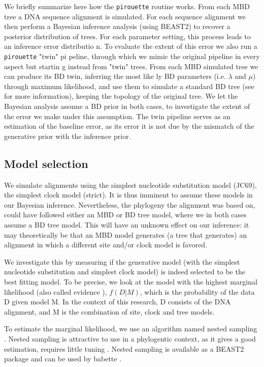 We briefly summarize here how the \verb;pirouette; routine works.
From each MBD tree a DNA sequence alignment is simulated. 
For each sequence alignment we then perform a Bayesian inference analysis (using
 BEAST2) to recover a posterior distribution of trees. 
For each parameter setting, this process leads to an inference error distributio
n. To evaluate the extent of this error we also run a \verb;pirouette; "twin" pi
peline, through which we mimic the original pipeline in every aspect but startin
g instead from "twin" trees.
From each MBD simulated tree we can produce its BD twin, inferring the most like
ly BD parameters (i.e. $\lambda$ and $\mu$) through maximum likelihood, and use 
them to simulate a standard BD tree (see \cite{pirouette} for more information),
 keeping the topology of the original tree.
We let the Bayesian analysis assume a BD prior in both cases, to investigate the
 extent of the error we make under this assumption. The twin pipeline serves as 
an estimation of the baseline error, as its error it is not due by the mismatch 
of the generative prior with the inference prior.

\iffalse
\subsection{Model selection}

We simulate alignments using the simplest nucleotide substitution model (JC69),
the simplest clock model (strict). It is thus imminent to assume these
models in our Bayesian inference. Nevertheless, the phylogeny the alignment
was based on, could have followed either an MBD or BD tree model, 
where we in both cases assume a BD tree model. This will have 
an unknown effect on our inference: it may theoretically be that an MBD model
generates (a tree that generates) an alignment in which a different site 
and/or clock model is favored. 

We investigate this by measuring if the generative model (with the simplest
nucleotide substitution and simplest clock model) is indeed selected 
to be the best fitting model. 
To be precise, we look at the model 
with the highest marginal likelihood 
(also called evidence \cite{mackay2003information}),
$f(D|M)$, which is the probability of the data D given model M.
In the context of this research, D consists of the DNA alignment,
and M is the combination of site, clock and tree models.

To estimate the marginal likelihood, 
we use an algorithm named nested sampling \cite{skilling2006nested}.
Nested sampling is attractive to use
in a phylogentic context, as it gives a good estimation,
requires little tuning \cite{maturana2018}.
Nested sampling is available as a BEAST2 package
and can be used by babette \cite{babette}.

